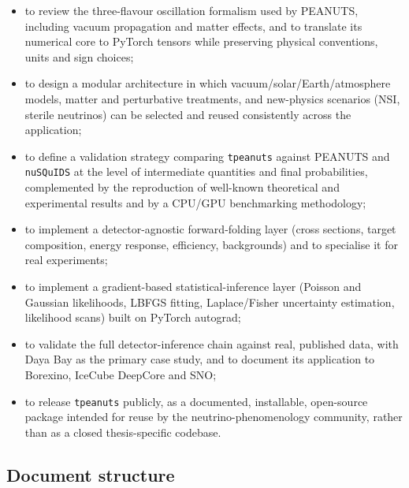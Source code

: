 \begin{itemize}
  \item to review the three-flavour oscillation formalism used by PEANUTS, including vacuum propagation and matter effects, and to translate its numerical core to PyTorch tensors while preserving physical conventions, units and sign choices;
  \item to design a modular architecture in which vacuum/solar/Earth/atmosphere models, matter and perturbative treatments, and new-physics scenarios (NSI, sterile neutrinos) can be selected and reused consistently across the application;
  \item to define a validation strategy comparing \texttt{tpeanuts} against PEANUTS and \texttt{nuSQuIDS} at the level of intermediate quantities and final probabilities, complemented by the reproduction of well-known theoretical and experimental results and by a CPU/GPU benchmarking methodology;
  \item to implement a detector-agnostic forward-folding layer (cross sections, target composition, energy response, efficiency, backgrounds) and to specialise it for real experiments;
  \item to implement a gradient-based statistical-inference layer (Poisson and Gaussian likelihoods, LBFGS fitting, Laplace/Fisher uncertainty estimation, likelihood scans) built on PyTorch autograd;
  \item to validate the full detector-inference chain against real, published data, with Daya Bay as the primary case study, and to document its application to Borexino, IceCube DeepCore and SNO;
  \item to release \texttt{tpeanuts} publicly, as a documented, installable, open-source package intended for reuse by the neutrino-phenomenology community, rather than as a closed thesis-specific codebase.
\end{itemize}

\subsection{Document structure}

